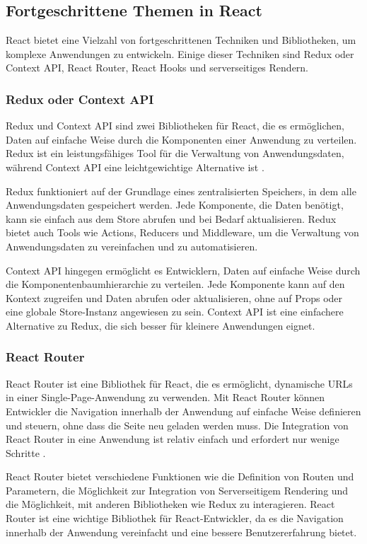 \subsection{Fortgeschrittene Themen in React}
React bietet eine Vielzahl von fortgeschrittenen Techniken und Bibliotheken, um komplexe Anwendungen zu entwickeln. Einige dieser Techniken sind Redux oder Context API, React Router, React Hooks und serverseitiges Rendern.
\subsubsection{Redux oder Context API}
Redux und Context API sind zwei Bibliotheken für React, die es ermöglichen, Daten auf einfache Weise durch die Komponenten einer Anwendung zu verteilen. Redux ist ein leistungsfähiges Tool für die Verwaltung von Anwendungsdaten, während Context API eine leichtgewichtige Alternative ist \cite{reduxgettingstarted, reactcontext}.

Redux funktioniert auf der Grundlage eines zentralisierten Speichers, in dem alle Anwendungsdaten gespeichert werden. Jede Komponente, die Daten benötigt, kann sie einfach aus dem Store abrufen und bei Bedarf aktualisieren. Redux bietet auch Tools wie Actions, Reducers und Middleware, um die Verwaltung von Anwendungsdaten zu vereinfachen und zu automatisieren.

Context API hingegen ermöglicht es Entwicklern, Daten auf einfache Weise durch die Komponentenbaumhierarchie zu verteilen. Jede Komponente kann auf den Kontext zugreifen und Daten abrufen oder aktualisieren, ohne auf Props oder eine globale Store-Instanz angewiesen zu sein. Context API ist eine einfachere Alternative zu Redux, die sich besser für kleinere Anwendungen eignet.
\subsubsection{React Router}
React Router ist eine Bibliothek für React, die es ermöglicht, dynamische URLs in einer Single-Page-Anwendung zu verwenden. Mit React Router können Entwickler die Navigation innerhalb der Anwendung auf einfache Weise definieren und steuern, ohne dass die Seite neu geladen werden muss. Die Integration von React Router in eine Anwendung ist relativ einfach und erfordert nur wenige Schritte \cite{reactroutertutorial, reactrouteroverview}.

React Router bietet verschiedene Funktionen wie die Definition von Routen und Parametern, die Möglichkeit zur Integration von Serverseitigem Rendering und die Möglichkeit, mit anderen Bibliotheken wie Redux zu interagieren. React Router ist eine wichtige Bibliothek für React-Entwickler, da es die Navigation innerhalb der Anwendung vereinfacht und eine bessere Benutzererfahrung bietet.
